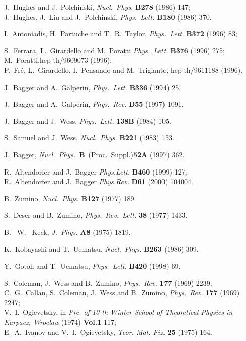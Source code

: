 \documentclass[a4paper,12pt]{article}
\begin{document}
%
\baselineskip 17pt
\begin{thebibliography}{99}

     J.~Hughes and J.~Polchinski, {\sl Nucl.~Phys.} {\bf B278} (1986) 147;\\
     J.~Hughes, J.~Liu and J.~Polchinski, {\sl Phys.~Lett.} 
     {\bf B180} (1986) 370.

     I.~Antoniadis, H.~Partuche and T.~R.~Taylor, {\sl Phys.~Lett.} 
     {\bf B372} (1996) 83;

     S.~Ferrara, L.~Girardello and M.~Poratti {\sl Phys.~Lett.} {\bf B376} 
     (1996) 275; \\
     M.~Poratti,hep-th/9609073 (1996);\\
     P.~Fr{\'e}, L.~Girardello, I.~Pensando and M.~Trigiante, hep-th/9611188
     (1996).

     J.~Bagger and A.~Galperin, {\sl Phys.~Lett.} {\bf B336} (1994) 25.

     J.~Bagger and A.~Galperin, {\sl Phys.~Rev.} {\bf D55} (1997) 1091.

     J.~Bagger and J.~Wess, {\sl Phys.~Lett.} {\bf 138B} (1984) 105.

     S.~Samuel and J.~Wess, {\sl Nucl.~Phys.} {\bf B221} (1983) 153.

     J.~Bagger, {\sl Nucl.~Phys.}~{\bf B}~(Proc.~Suppl.){\bf 52A} (1997) 362.

     R.~Altendorfer and  J.~Bagger {\sl Phys.Lett.} {\bf B460} (1999) 127;\\
     R.~Altendorfer and  J.~Bagger {\sl Phys.Rev.} {\bf D61} (2000) 104004. 

     B.~Zumino, {\sl Nucl.~Phys.} {\bf B127} (1977) 189.

     S.~Deser and B.~Zumino, {\sl Phys.~Rev.~Lett.} {\bf 38} (1977) 1433.

     B. ~W. ~Keck, {\sl J.~Phys.} {\bf A8} (1975) 1819.

     K.~Kobayashi and T.~Uematsu, {\sl Nucl.~Phys.} {\bf B263} (1986) 309.

     Y.~Gotoh and T.~Uematsu, {\sl Phys.~Lett.} {\bf B420} (1998) 69.

     S.~Coleman, J.~Wess and B.~Zumino, {\sl Phys.~Rev.} {\bf 177}
     (1969) 2239;\\
     C.~G.~Callan, S.~Coleman, J.~Wess and B.~Zumino, {\sl
     Phys.~Rev.} {\bf 177} (1969) 2247;\\
     V.~I.~Ogievetsky, in {\sl Prc. of 10 th Winter School of
     Theoretical Physics in Karpacz, Wroclaw} (1974) {\bf Vol.1} 117;\\
     E.~A.~Ivanov and  V.~I.~Ogievetsky, {\sl Teor. Mat. Fiz.} {\bf
     25} (1975) 164.


\end{thebibliography}
\end{document}
